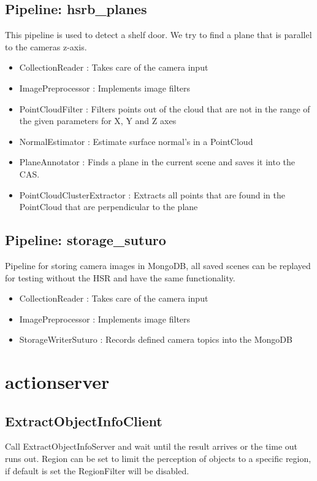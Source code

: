 \documentclass[main.tex]{subfiles}
\begin{document}
			\subsection{Pipeline: hsrb\_planes} 
This pipeline is used to detect a shelf door. We try to find a plane that is parallel to the cameras z-axis.
\begin{itemize}
	\item CollectionReader : Takes care of the camera input
	\item ImagePreprocessor : Implements image filters  
	\item PointCloudFilter : Filters points out of the cloud that are not in the range of the given parameters for X, Y and Z axes
	\item NormalEstimator : Estimate surface normal's in a PointCloud 
	\item PlaneAnnotator : Finds a plane in the current scene and saves it into the CAS.
	\item PointCloudClusterExtractor : Extracts all points that are found in the PointCloud that are perpendicular to the plane 
\end{itemize}

			\subsection{Pipeline: storage\_suturo} 
Pipeline for storing camera images in MongoDB, all saved scenes can be replayed for testing without the HSR and have the same functionality. 
\begin{itemize}
	\item CollectionReader : Takes care of the camera input
	\item ImagePreprocessor : Implements image filters 
	\item StorageWriterSuturo :  Records defined camera topics into the MongoDB
\end{itemize}

		\section{actionserver}
			\subsection{ExtractObjectInfoClient}
Call ExtractObjectInfoServer and wait until the result arrives or the time out runs out. Region can be set to limit the perception of objects to a specific region, if default is set the RegionFilter will be disabled. 
\end{document}

